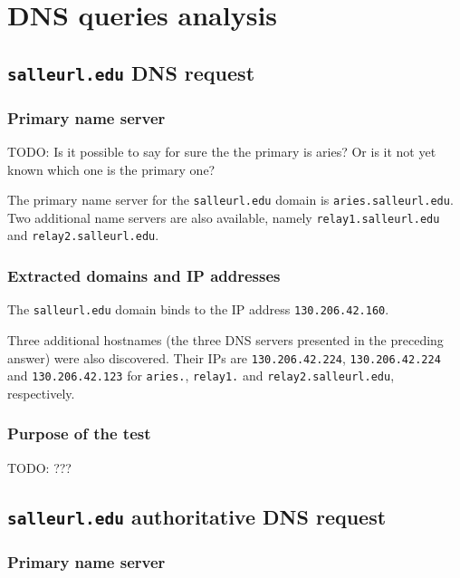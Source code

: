 \section{DNS queries analysis}

\subsection{\texttt{salleurl.edu} DNS request}

\subsubsection{Primary name server}

TODO: Is it possible to say for sure the the primary is aries? Or is it not yet known which one is the primary one?

The primary name server for the {\tt salleurl.edu} domain is {\tt aries.salleurl.edu}. Two additional name servers are also available, namely {\tt relay1.salleurl.edu} and {\tt relay2.salleurl.edu}.

\subsubsection{Extracted domains and IP addresses}

The {\tt salleurl.edu} domain binds to the IP address {\tt 130.206.42.160}.

Three additional hostnames (the three DNS servers presented in the preceding answer) were also discovered. Their IPs are {\tt 130.206.42.224}, {\tt 130.206.42.224} and {\tt 130.206.42.123} for {\tt aries.}, {\tt relay1.} and {\tt relay2.salleurl.edu}, respectively.

\subsubsection{Purpose of the test}

TODO: ???



\subsection{\texttt{salleurl.edu} authoritative DNS request}

\subsubsection{Primary name server}

